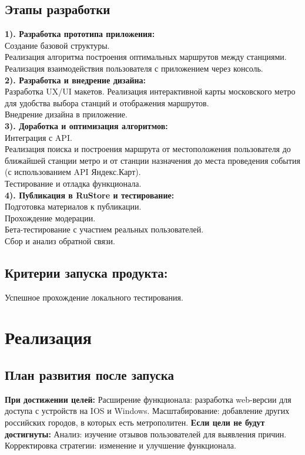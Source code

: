 \documentclass[a4paper,12pt]{extarticle}
\begin{document}
\subsection{Этапы разработки} 
\noindent
\textbf{1). Разработка прототипа приложения:}
\\
Создание базовой структуры.
\\
Реализация алгоритма построения оптимальных маршрутов между станциями.
\\
Реализация взаимодействия пользователя с приложением через консоль.
\\
\textbf{2). Разработка и внедрение дизайна:}
\\
Разработка UX/UI макетов. 
Реализация интерактивной карты московского метро для удобства выбора станций и отображения маршрутов.
\\
Внедрение дизайна в приложение.
\\
\textbf{3). Доработка и оптимизация алгоритмов:}
\\
Интеграция с API.
\\
Реализация поиска и построения маршрута от местоположения пользователя до ближайшей станции метро и от станции назначения до места проведения события 
(с использованием API Яндекс.Карт).
\\
Тестирование и отладка функционала.
\\
\textbf{4). Публикация в RuStore и тестирование:}
\\
Подготовка материалов к публикации.
\\
Прохождение модерации.
\\
Бета-тестирование с участием реальных пользователей.
\\
Сбор и анализ обратной связи.

\subsection{Критерии запуска продукта:}
\noindent
Успешное прохождение локального тестирования.

\section{Реализация}
\subsection{План развития после запуска} 
\noindent
\textbf{При достижении целей:}
\newline
Расширение функционала: разработка web-версии для доступа с устройств на IOS и Windows.
\newline
Масштабирование: добавление других российских городов, в которых есть метрополитен.
\newline
\textbf{Если цели не будут достигнуты:}
\newline
Анализ: изучение отзывов пользователей для выявления причин.
\newline
Корректировка стратегии: изменение и улучшение функционала.
\end{document}
